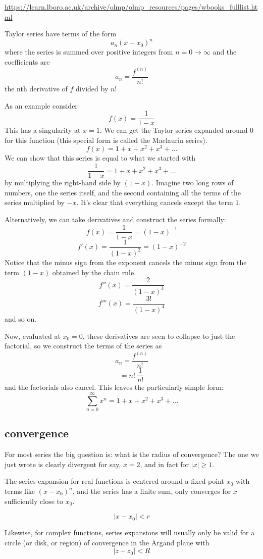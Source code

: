 \documentclass[11pt, oneside]{article}
\begin{document}
\url{https://learn.lboro.ac.uk/archive/olmp/olmp_resources/pages/wbooks_fulllist.html}

Taylor series have terms of the form
\[ a_n (x-x_0)^n \] 
where the series is summed over positive integers from $n = 0 \rightarrow \infty$ and the coefficients are
\[ a_n = \frac{f^{(n)}}{n!} \]
the nth derivative of $f$ divided by $n!$

As an example consider
\[ f(x) = \frac{1}{1 - x} \]
This has a singularity at $x = 1$.  We can get the Taylor series expanded around $0$ for this function (this special form is called the Maclaurin series).
\[ f(x) = 1 + x + x^2 + x^3 + \dots \]
We can show that this series is equal to what we started with
\[ \frac{1}{1 - x} = 1 + x + x^2 + x^3 + \dots \]
by multiplying the right-hand side by $(1-x)$.  Imagine two long rows of numbers, one the series itself, and the second containing all the terms of the series multiplied by $-x$.  It's clear that everything cancels except the term $1$.

Alternatively, we can take derivatives and construct the series formally:
\[ f(x) = \frac{1}{1 - x} = (1-x)^{-1} \]
\[ f'(x) = \frac{1}{(1 - x)^2} = (1-x)^{-2} \]
Notice that the minus sign from the exponent cancels the minus sign from the term $(1-x)$ obtained by the chain rule.  
\[ f''(x) = \frac{2}{(1 - x)^3} \]
\[ f'''(x) = \frac{3!}{(1 - x)^4} \]
and so on.

Now, evaluated at $x_0 = 0$, these derivatives are seen to collapse to just the factorial, so we construct the terms of the series as
\[ a_n = \frac{f^{(n)}}{n!} \]
\[ = n! \ \frac{1}{n!} \]
and the factorials also cancel.  This leaves the particularly simple form:
\[ \sum_{n=0}^{\infty} x^n = 1 + x + x^2 + x^3 + \dots \]

\subsection*{convergence}
For most series the big question is:  what is the radius of convergence?  The one we just wrote is clearly divergent for say, $x = 2$, and in fact for $|x| \ge 1$.

The series expansion for real functions is centered around a fixed point $x_0$ with terms like $(x - x_0)^n$, and the series has a finite sum, only converges for $x$ sufficiently close to $x_0$.

\[ |x - x_0| < r \]

Likewise, for complex functions, series expansions will usually only be valid for a circle (or disk, or region) of convergence in the Argand plane with 
\[ | z - z_0 | < R \]
\end{document}
